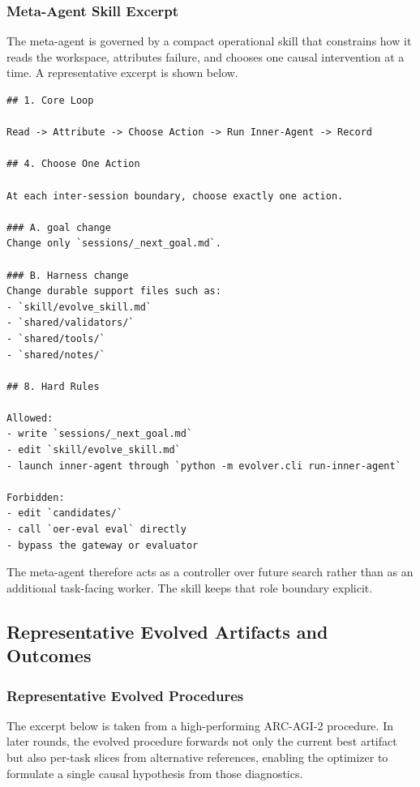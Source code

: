 \subsubsection{Meta-Agent Skill Excerpt}
\label{app:meta_agent_skill}

The meta-agent is governed by a compact operational skill that constrains how it reads the workspace, attributes failure, and chooses one causal intervention at a time. A representative excerpt is shown below.

\begin{lstlisting}[style=papercode]
## 1. Core Loop

Read -> Attribute -> Choose Action -> Run Inner-Agent -> Record

## 4. Choose One Action

At each inter-session boundary, choose exactly one action.

### A. goal change
Change only `sessions/_next_goal.md`.

### B. Harness change
Change durable support files such as:
- `skill/evolve_skill.md`
- `shared/validators/`
- `shared/tools/`
- `shared/notes/`

## 8. Hard Rules

Allowed:
- write `sessions/_next_goal.md`
- edit `skill/evolve_skill.md`
- launch inner-agent through `python -m evolver.cli run-inner-agent`

Forbidden:
- edit `candidates/`
- call `oer-eval eval` directly
- bypass the gateway or evaluator
\end{lstlisting}

The meta-agent therefore acts as a controller over future search rather than as an additional task-facing worker. The skill keeps that role boundary explicit.

\subsection{Representative Evolved Artifacts and Outcomes}

\subsubsection{Representative Evolved Procedures}
\label{appendix:opt_procedure}

The excerpt below is taken from a high-performing ARC-AGI-2 procedure. In later rounds, the evolved procedure forwards not only the current best artifact but also per-task slices from alternative references, enabling the optimizer to formulate a single causal hypothesis from those diagnostics.

